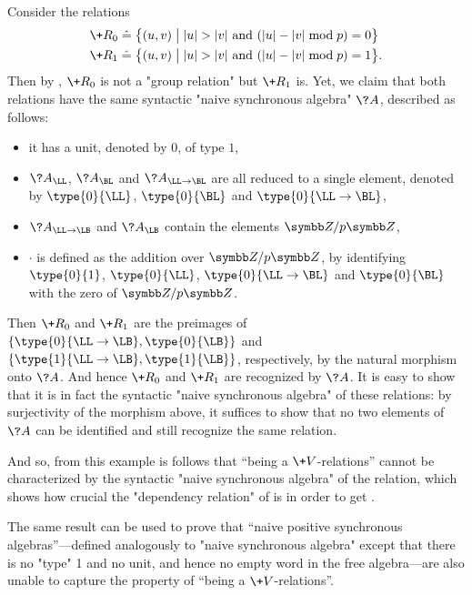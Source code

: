 \begin{example}
	Consider the relations
	\begin{align*}
		\+R_0 \defeq \big\{
			(u,v) \;\big\vert\; & |u| > |v| \text{ and } (|u| - |v| \bmod{p}) = 0
		\big\} \\
		\+R_1 \defeq \big\{
			(u,v) \;\big\vert\; & |u| > |v| \text{ and } (|u| - |v| \bmod{p}) = 1
		\big\}.
	\end{align*}
	Then by , $\+R_0$ is not a "group relation" but
	$\+R_1$ is.
	Yet, we claim that both relations have the same syntactic "naive synchronous algebra" $\?A$, described as follows:
	\begin{itemize}
		\item it has a unit, denoted by $0$, of type $1$,
		\item $\?A_{\LL}$, $\?A_{\BL}$ and $\?A_{\LL\to\BL}$ are all reduced to a single element,
			denoted by $\type{0}{\LL}$, $\type{0}{\BL}$ and $\type{0}{\LL\to\BL}$,
		\item $\?A_{\LL\to\LB}$ and $\?A_{\LB}$ contain the elements $\Z/p\Z$,
		\item $\cdot$ is defined as the addition over $\Z/p\Z$, by identifying
			$\type{0}{1}$, $\type{0}{\LL}$, $\type{0}{\LL\to\BL}$ and $\type{0}{\BL}$
			with the zero of $\Z/p\Z$.
	\end{itemize}
	Then $\+R_0$ and $\+R_1$ are the preimages of $\{\type{0}{\LL\to\LB}, \type{0}{\LB}\}$
	and $\{\type{1}{\LL\to\LB}, \type{1}{\LB}\}$, respectively, by the natural morphism onto $\?A$.
	And hence $\+R_0$ and $\+R_1$ are recognized by $\?A$. It is easy to show that it is in fact the syntactic "naive synchronous algebra" of these relations: by surjectivity of the morphism 
	above, it suffices to show that no two elements of $\?A$ can be identified and still recognize 
	the same relation.
\end{example}

And so, from this example is follows that ``being a $\+V$-relations'' cannot be characterized
by the syntactic "naive synchronous algebra" of the relation, which shows how crucial the "dependency relation" of  is in order to get .

The same result can be used to prove that ``naive positive synchronous algebras''---defined analogously to "naive synchronous algebra" except that there is no "type" 1 and no unit, and hence no empty word in the free algebra---are also unable to capture the property of ``being a $\+V$-relations''.

